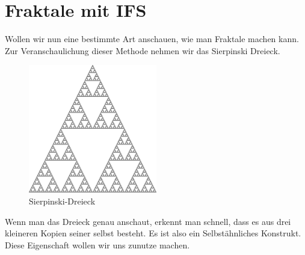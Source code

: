 %
%
%
\section{Fraktale mit IFS 
\label{ifs:section:teil2}}
Wollen wir nun eine bestimmte Art anschauen, wie man Fraktale machen kann.
Zur Veranschaulichung dieser Methode nehmen wir das Sierpinski Dreieck.
\begin{figure}
	\centering
	\includegraphics[width=0.5\textwidth]{papers/ifs/images/sierpinski}
	\caption{Sierpinski-Dreieck}
	\label{ifs:sierpinski10}
\end{figure}
Wenn man das Dreieck genau anschaut, erkennt man schnell, dass es aus drei kleineren Kopien seiner selbst besteht.
Es ist also ein Selbstähnliches Konstrukt.
Diese Eigenschaft wollen wir uns zunutze machen.


